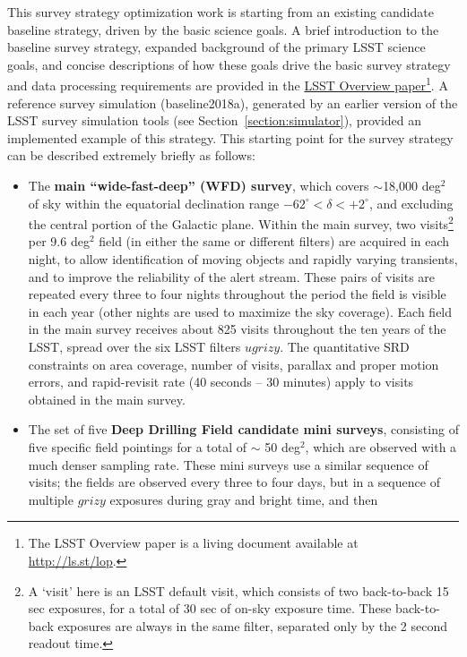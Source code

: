 This survey strategy optimization work is starting from an existing candidate baseline strategy, driven by the basic science goals. A brief introduction to the baseline survey strategy, expanded background of the primary LSST science goals, and concise descriptions of how these goals drive the basic survey strategy and data processing requirements are provided in the \href{http://ls.st/lop}{LSST Overview paper}\footnote{The LSST Overview paper is a living document available at \href{http://ls.st/lop}{http://ls.st/lop}.}. A reference survey simulation (baseline2018a), generated by an earlier version of the LSST survey simulation tools (see Section~\ref{section:simulator}), provided an implemented example of this strategy. This starting point for the survey strategy can be described extremely briefly as follows:
\begin{itemize}
\item The {\bf main ``wide-fast-deep''  (WFD) survey}, which covers $\sim$18,000 deg$^2$ of sky within
the equatorial declination
range $-62^\circ < \delta < +2^\circ$, and excluding the central portion of the Galactic 
plane. Within the main survey, two visits\footnote{A `visit' here is an LSST default visit, which 
consists of two back-to-back 15 sec exposures, for a total of 30 sec of on-sky exposure time. These back-to-back exposures are always
in the same filter, separated only by the 2 second readout time.} 
per 9.6 deg$^2$ field (in either the same or different filters) are acquired in each night, to allow identification of moving objects and rapidly varying transients, and to improve
the reliability of the alert stream. These pairs of visits are repeated every three to four nights throughout the period the field is visible in each year (other nights are used to maximize the sky coverage). Each
field in the main survey receives about 825 visits throughout the ten years of the LSST, spread over the six LSST filters 
$ugrizy$. The quantitative SRD constraints on area coverage, number of visits, parallax and proper motion errors, and 
rapid-revisit rate (40 seconds -- 30 minutes) apply to visits obtained in the main survey. 
\item The set of five {\bf Deep Drilling Field candidate mini surveys}, consisting of five specific field pointings for a total of $\sim$ 50 deg$^2$, 
which are observed with a much denser sampling rate. These mini surveys use a similar sequence of visits; the fields
are observed every three to four days, but in a sequence of multiple $grizy$ exposures during gray and bright time, and then

\end{itemize}
